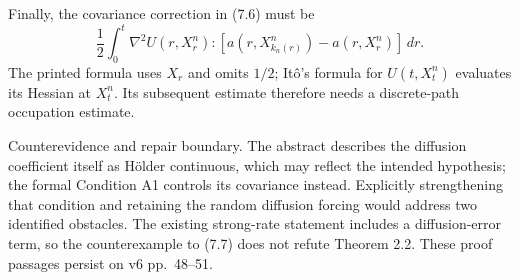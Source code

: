 \documentclass[10pt]{article}
\begin{document}
Finally, the covariance correction in (7.6) must be \[\frac12\int_0^t\nabla^2U(r,X_r^n):
 [a(r,X_{k_n(r)}^n)-a(r,X_r^n)]\,dr.\] The printed formula uses \(X_r\) and omits \(1/2\); Itô’s formula for \(U(t,X_t^n)\) evaluates its Hessian at \(X_t^n\). Its subsequent estimate therefore needs a discrete-path occupation estimate.\par
Counterevidence and repair boundary. The abstract describes the diffusion coefficient itself as Hölder continuous, which may reflect the intended hypothesis; the formal Condition A1 controls its covariance instead. Explicitly strengthening that condition and retaining the random diffusion forcing would address two identified obstacles. The existing strong-rate statement includes a diffusion-error term, so the counterexample to (7.7) does not refute Theorem 2.2. These proof passages persist on v6 pp. 48–51.\par
\end{document}
